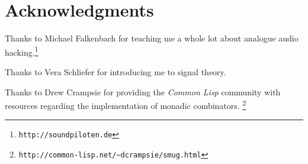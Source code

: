 \section{Acknowledgments}

Thanks to Michael Falkenbach for teaching me a whole lot about analogue
audio hacking.\footnote{\texttt{http://soundpiloten.de}}

Thanks to Vera Schliefer for introducing me to signal theory.

Thanks to Drew Crampsie for providing the \textit{Common Lisp} community
with resources regarding the implementation of monadic combinators.
\footnote{\texttt{http://common-lisp.net/\textasciitilde{}dcrampsie/smug.html}}
